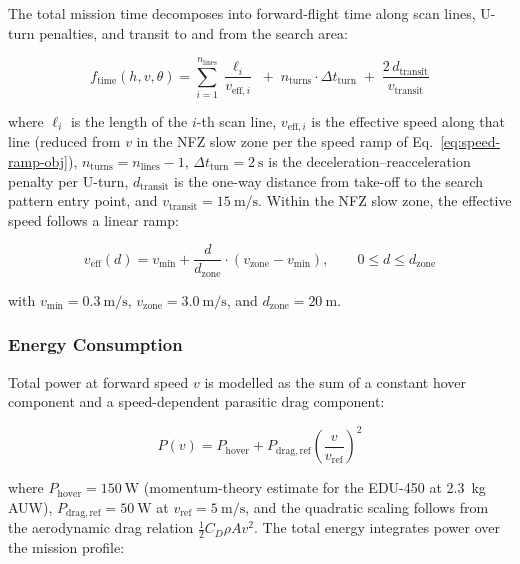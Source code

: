 The total mission time decomposes into forward-flight time along scan lines, U-turn penalties, and transit to and from the search area:

\begin{equation}\label{eq:time}
  f_{\mathrm{time}}(h, v, \theta) = \sum_{i=1}^{n_{\mathrm{lines}}} \frac{\ell_i}{v_{\mathrm{eff},i}} \;+\; n_{\mathrm{turns}} \cdot \Delta t_{\mathrm{turn}} \;+\; \frac{2 \, d_{\mathrm{transit}}}{v_{\mathrm{transit}}}
\end{equation}

\noindent where $\ell_i$ is the length of the $i$-th scan line, $v_{\mathrm{eff},i}$ is the effective speed along that line (reduced from $v$ in the NFZ slow zone per the speed ramp of Eq.~\eqref{eq:speed-ramp-obj}), $n_{\mathrm{turns}} = n_{\mathrm{lines}} - 1$, $\Delta t_{\mathrm{turn}} = \SI{2}{\second}$ is the deceleration--reacceleration penalty per U-turn, $d_{\mathrm{transit}}$ is the one-way distance from take-off to the search pattern entry point, and $v_{\mathrm{transit}} = \SI{15}{\metre\per\second}$. Within the NFZ slow zone, the effective speed follows a linear ramp:

\begin{equation}\label{eq:speed-ramp-obj}
  v_{\mathrm{eff}}(d) = v_{\mathrm{min}} + \frac{d}{d_{\mathrm{zone}}} \cdot (v_{\mathrm{zone}} - v_{\mathrm{min}}), \qquad 0 \leq d \leq d_{\mathrm{zone}}
\end{equation}

\noindent with $v_{\mathrm{min}} = \SI{0.3}{\metre\per\second}$, $v_{\mathrm{zone}} = \SI{3.0}{\metre\per\second}$, and $d_{\mathrm{zone}} = \SI{20}{\metre}$.

\subsubsection{Energy Consumption}\label{sec:obj-energy}

Total power at forward speed $v$ is modelled as the sum of a constant hover component and a speed-dependent parasitic drag component:

\begin{equation}\label{eq:power}
  P(v) = P_{\mathrm{hover}} + P_{\mathrm{drag,ref}} \left(\frac{v}{v_{\mathrm{ref}}}\right)^{\!2}
\end{equation}

\noindent where $P_{\mathrm{hover}} = \SI{150}{\watt}$ (momentum-theory estimate for the EDU-450 at \SI{2.3}{\kilo\gram} AUW), $P_{\mathrm{drag,ref}} = \SI{50}{\watt}$ at $v_{\mathrm{ref}} = \SI{5}{\metre\per\second}$, and the quadratic scaling follows from the aerodynamic drag relation $\tfrac{1}{2} C_D \rho A v^2$. The total energy integrates power over the mission profile:

